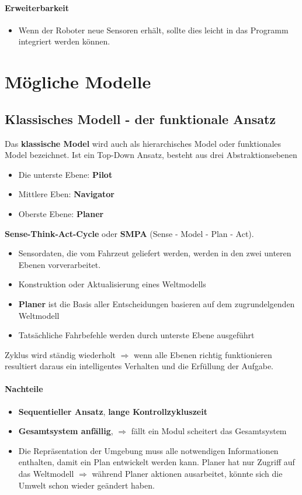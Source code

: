 \paragraph{Erweiterbarkeit}
\begin{itemize}
	\item Wenn der Roboter neue Sensoren erhält, sollte dies leicht in das Programm integriert werden können.
\end{itemize}
\section{Mögliche Modelle}
\subsection{Klassisches Modell - der funktionale Ansatz}
Das \textbf{klassische Model} wird auch als hierarchisches Model oder funktionales Model bezeichnet.
Ist ein Top-Down Ansatz, besteht aus drei Abstraktionsebenen
\begin{itemize}
	\item Die unterste Ebene: \textbf{Pilot}
	\item Mittlere Eben: \textbf{Navigator}
	\item Oberste Ebene: \textbf{Planer}
\end{itemize}
\textbf{Sense-Think-Act-Cycle} oder \textbf{SMPA} (Sense - Model - Plan - Act).
\begin{itemize}
	\item Sensordaten, die vom Fahrzeut geliefert werden, werden in den zwei unteren Ebenen vorverarbeitet.
	\item Konstruktion oder Aktualisierung eines Weltmodells
	\item \textbf{Planer} ist die Basis aller Entscheidungen basieren auf dem zugrundelgenden Weltmodell
	\item Tatsächliche Fahrbefehle werden durch unterste Ebene ausgeführt
\end{itemize}
Zyklus wird ständig wiederholt $\Rightarrow$ wenn alle Ebenen richtig funktionieren resultiert daraus ein intelligentes Verhalten und die Erfüllung der Aufgabe.
\paragraph{Nachteile}
\begin{itemize}
	\item \textbf{Sequentieller Ansatz}, \textbf{lange Kontrollzykluszeit}
	\item \textbf{Gesamtsystem anfällig}, $\Rightarrow$ fällt ein Modul scheitert das Gesamtsystem
	\item Die Repräsentation der Umgebung muss alle notwendigen Informationen enthalten, damit ein Plan entwickelt werden kann.
	Planer hat nur Zugriff auf das Weltmodell $\Rightarrow$ während Planer aktionen ausarbeitet, könnte sich die Umwelt schon wieder geändert haben.
\end{itemize}
